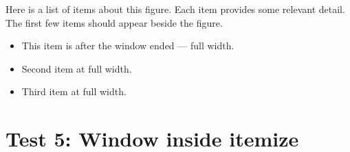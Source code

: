 \begin{window}
  Here is a list of items about this figure. Each item provides some
  relevant detail. The first few items should appear beside the figure.
  \lipsum[8][1-3]
\end{window}

\begin{itemize}
  \item This item is after the window ended — full width.
  \item Second item at full width.
  \item Third item at full width.
\end{itemize}


\section{Test 5: Window inside itemize}

